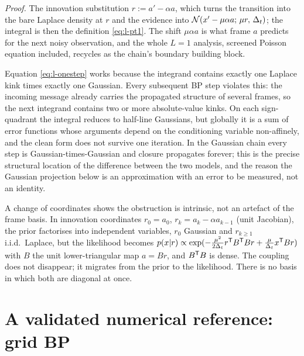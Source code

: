 \emph{Proof.} The innovation substitution $r := a' - \alpha a$, which
turns the transition into the bare Laplace density at $r$ and the
evidence into $\mathcal{N}(x' - \mu\alpha a;\, \mu r,\, \Delta_t)$; the integral
is then the definition \eqref{eq:l-pt1}. The shift $\mu\alpha a$ is what
frame $a$ predicts for the next noisy observation, and the whole $L = 1$
analysis, screened Poisson equation included, recycles as the chain's
boundary building block.

\begin{remark}\label{rmk:l-breakdown}
Equation \eqref{eq:l-onestep} works because the integrand contains
exactly one Laplace kink times exactly one Gaussian. Every subsequent BP
step violates this: the incoming message already carries the propagated
structure of several frames, so the next integrand contains two or more
absolute-value kinks. On each sign-quadrant the integral reduces to
half-line Gaussians, but globally it is a sum of error functions whose
arguments depend on the conditioning variable non-affinely, and the clean
form does not survive one iteration. In the Gaussian chain every step is
Gaussian-times-Gaussian and closure propagates forever; this is the
precise structural location of the difference between the two models, and
the reason the Gaussian projection below is an approximation with an
error to be measured, not an identity.
\end{remark}

A change of coordinates shows the obstruction is intrinsic, not an
artefact of the frame basis. In innovation coordinates $r_0 = a_0$,
$r_k = a_k - \alpha a_{k-1}$ (unit Jacobian), the prior factorises into
independent variables, $r_0$ Gaussian and $r_{k\geq1}$ i.i.d.\
Laplace, but the likelihood becomes
$p(x|r) \propto \exp(-\tfrac{\mu^2}{2\Delta_t} r^{\mathsf{T}} B^{\mathsf{T}} B r
+ \tfrac{\mu}{\Delta_t} x^{\mathsf{T}} B r)$ with $B$ the unit lower-triangular
map $a = Br$, and $B^{\mathsf{T}} B$ is dense. The coupling does not disappear; it
migrates from the prior to the likelihood. There is no basis in which
both are diagonal at once.

\section{A validated numerical reference: grid BP}\label{sec:l-grid}

